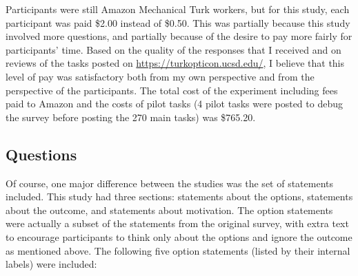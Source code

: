 Participants were still Amazon Mechanical Turk workers, but for this study, each participant was paid \$2.00 instead of \$0.50.
%
This was partially because this study involved more questions, and partially because of the desire to pay more fairly for participants' time.
%
Based on the quality of the responses that I received and on reviews of the tasks posted on \url{https://turkopticon.ucsd.edu/}, I believe that this level of pay was satisfactory both from my own perspective and from the perspective of the participants.
%
The total cost of the experiment including fees paid to Amazon and the costs of pilot tasks (4 pilot tasks were posted to debug the survey before posting the 270 main tasks) was \$765.20.


\subsection{Questions}

Of course, one major difference between the studies was the set of statements included.
%
This study had three sections: statements about the options, statements about the outcome, and statements about motivation.
%
The option statements were actually a subset of the statements from the original survey, with extra text to encourage participants to think only about the options and ignore the outcome as mentioned above.
%
The following five option statements (listed by their internal labels) were included: \\[0.3\baselineskip]
%
{
   \\
   \\
   \\
   \\
   \\
}


